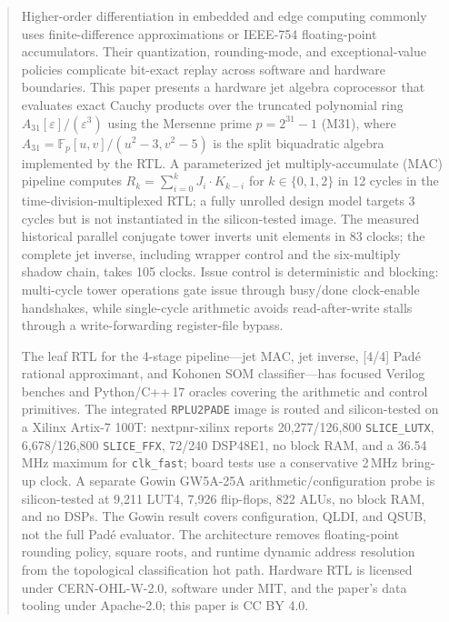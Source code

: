 \documentclass[conference]{IEEEtran}
\begin{document}
\begin{abstract}
Higher-order differentiation in embedded and edge computing commonly uses
finite-difference approximations or IEEE-754 floating-point accumulators.
Their quantization, rounding-mode, and exceptional-value policies complicate
bit-exact replay across software and hardware boundaries. This paper presents a hardware jet algebra
coprocessor that evaluates exact Cauchy products over the truncated
polynomial ring $A_{31}[\varepsilon]/(\varepsilon^3)$ using the
Mersenne prime $p = 2^{31}-1$ (M31), where
$A_{31}=\mathbb{F}_p[u,v]/(u^2-3,v^2-5)$ is the split biquadratic algebra
implemented by the RTL.  A parameterized jet multiply-accumulate
(MAC) pipeline computes $R_k = \sum_{i=0}^{k} J_i \cdot K_{k-i}$ for $k \in
\{0,1,2\}$ in 12 cycles in the time-division-multiplexed RTL; a fully
unrolled design model targets 3 cycles but is not instantiated in the
silicon-tested image. The measured historical parallel conjugate tower
inverts unit elements in 83 clocks; the complete jet inverse, including
wrapper control and the six-multiply shadow chain, takes 105 clocks. Issue
control is deterministic and blocking:
multi-cycle tower operations gate issue through busy/done clock-enable
handshakes, while single-cycle arithmetic avoids read-after-write stalls
through a write-forwarding register-file bypass.

The leaf RTL for the 4-stage pipeline---jet MAC, jet inverse, [4/4] Pad\'{e} rational
approximant, and Kohonen SOM classifier---has focused Verilog benches and
Python/C++$\,$17 oracles covering the arithmetic and control primitives. The
integrated \texttt{RPLU2PADE} image is routed and silicon-tested on a Xilinx
Artix-7 100T: nextpnr-xilinx reports 20,277/126,800 \texttt{SLICE\_LUTX},
6,678/126,800 \texttt{SLICE\_FFX}, 72/240 DSP48E1, no block RAM, and a
36.54\,MHz maximum for \texttt{clk\_fast}; board tests use a conservative
2\,MHz bring-up clock. A separate Gowin GW5A-25A arithmetic/configuration
probe is silicon-tested at 9,211 LUT4, 7,926 flip-flops, 822 ALUs, no block
RAM, and no DSPs. The Gowin result covers configuration, QLDI, and QSUB, not
the full Pad\'{e} evaluator. The architecture removes floating-point
rounding policy, square roots, and runtime dynamic address resolution from
the topological classification hot path.
Hardware RTL is licensed under CERN-OHL-W-2.0, software under MIT, and the
paper's data tooling under Apache-2.0; this paper is CC BY 4.0.
\end{abstract}
\end{document}
